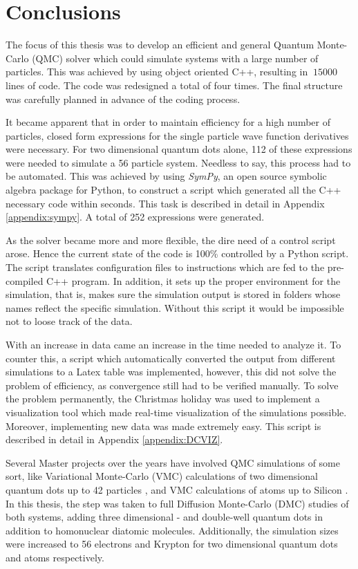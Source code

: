 \chapter{Conclusions}

The focus of this thesis was to develop an efficient and general Quantum Monte-Carlo (QMC) solver which could simulate systems with a large number of particles. This was achieved by using object oriented C++, resulting in $~15000$ lines of code. The code was redesigned a total of four times. The final structure was carefully planned in advance of the coding process.

It became apparent that in order to maintain efficiency for a high number of particles, closed form expressions for the single particle wave function derivatives were necessary. For two dimensional quantum dots alone, 112 of these expressions were needed to simulate a 56 particle system. Needless to say, this process had to be automated. This was achieved by using \textit{SymPy}, an open source symbolic algebra package for Python, to construct a script which generated all the C++ necessary code within seconds. This task is described in detail in Appendix \ref{appendix:sympy}. A total of 252 expressions were generated.

As the solver became more and more flexible, the dire need of a control script arose. Hence the current state of the code is 100\% controlled by a Python script. The script translates configuration files to instructions which are fed to the pre-compiled C++ program. In addition, it sets up the proper environment for the simulation, that is, makes sure the simulation output is stored in folders whose names reflect the specific simulation. Without this script it would be impossible not to loose track of the data.

With an increase in data came an increase in the time needed to analyze it. To counter this, a script which automatically converted the output from different simulations to a Latex table was implemented, however, this did not solve the problem of efficiency, as convergence still had to be verified manually. To solve the problem permanently, the Christmas holiday was used to implement a visualization tool which made real-time visualization of the simulations possible. Moreover, implementing new data was made extremely easy. This script is described in detail in Appendix \ref{appendix:DCVIZ}. 

Several Master projects over the years have involved QMC simulations of some sort, like Variational Monte-Carlo (VMC) calculations of two dimensional quantum dots up to 42 particles \cite{larseivind}, and VMC calculations of atoms up to Silicon \cite{vmcAtoms}. In this thesis, the step was taken to full Diffusion Monte-Carlo (DMC) studies of both systems, adding three dimensional - and double-well quantum dots in addition to homonuclear diatomic molecules. Additionally, the simulation sizes were increased to 56 electrons and Krypton for two dimensional quantum dots and atoms respectively.    

